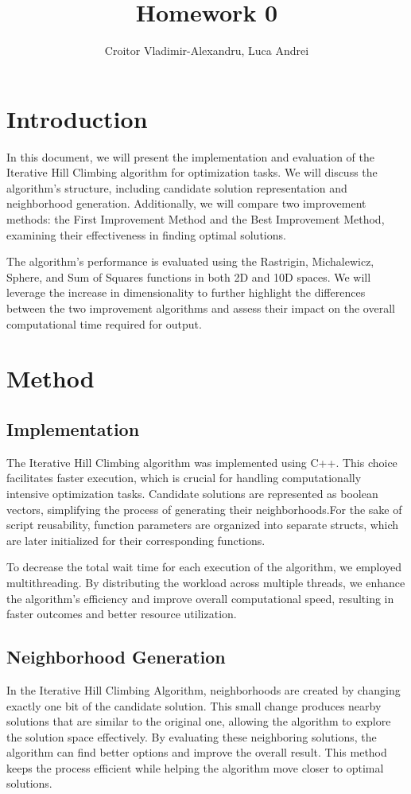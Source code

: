 \documentclass{article}
\author{Croitor Vladimir-Alexandru, Luca Andrei}
\title{Homework 0}
\begin{document}
\maketitle

\section{Introduction}
In this document, we will present the implementation and evaluation of the Iterative Hill Climbing algorithm for optimization tasks. We will discuss the algorithm's structure, including candidate solution representation and neighborhood generation. Additionally, we will compare two improvement methods: the First Improvement Method and the Best Improvement Method, examining their effectiveness in finding optimal solutions.

The algorithm's performance is evaluated using the Rastrigin, Michalewicz, Sphere, and Sum of Squares functions in both 2D and 10D spaces. We will leverage the increase in dimensionality to further highlight the differences between the two improvement algorithms and assess their impact on the overall computational time required for output.

\section{Method}

\subsection{Implementation}


The Iterative Hill Climbing algorithm was implemented using C++. This choice facilitates faster execution, which is crucial for handling computationally intensive optimization tasks. Candidate solutions are represented as boolean vectors, simplifying the process of generating their neighborhoods.For the sake of script reusability, function parameters are organized into separate structs, which are later initialized for their corresponding functions.

To decrease the total wait time for each execution of the algorithm, we employed multithreading. By distributing the workload across multiple threads, we enhance the algorithm's efficiency and improve overall computational speed, resulting in faster outcomes and better resource utilization.
	


\subsection{Neighborhood Generation}
In the Iterative Hill Climbing Algorithm, neighborhoods are created by changing exactly one bit of the candidate solution. This small change produces nearby solutions that are similar to the original one, allowing the algorithm to explore the solution space effectively. By evaluating these neighboring solutions, the algorithm can find better options and improve the overall result. This method keeps the process efficient while helping the algorithm move closer to optimal solutions.
\end{document}
